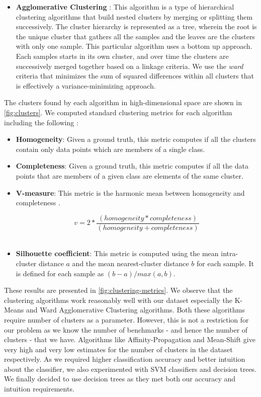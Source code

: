 \begin{itemize}
\item \textbf{Agglomerative Clustering} :
This algorithm is a type of hierarchical clustering algorithms that build nested clusters 
by merging or splitting them successively. 
The cluster hierarchy is represented as a tree, wherein the root is the unique
cluster that gathers all the samples and the leaves are the clusters with only
one sample. 
This particular algorithm uses a bottom up approach. Each samples starts in
its own cluster, and over time the clusters are successively merged together
based on a linkage criteria.
We use the \textit{ward} criteria that minimizes the sum of squared differences 
within all clusters that is effectively a variance-minimizing approach.
\end{itemize}

The clusters found by each algorithm in high-dimensional space are shown in
\cref{fig:clusters}.
We computed standard clustering metrics for each algorithm including the
following :\\

\begin{itemize}
  \item \textbf{Homogeneity}:
	Given a ground truth, this metric computes if all the clusters contain only
	data points which are members of a single class.\\

  \item \textbf{Completeness}: 
	Given a ground truth, this metric computes if all the data points that are
	members of a given class are elements of the same cluster.\\

  \item \textbf{V-measure}: 
	This metric is the harmonic mean between homogeneity and completeness
	\citep{v-measure}.

	$$v = 2 * \frac{(homogeneity * completeness)}{(homogeneity + completeness)}$$\\

  \item \textbf{Silhouette coefficient}: 
  This metric is computed using the mean intra-cluster distance
  $a$ and the mean nearest-cluster distance $b$ for each sample.
  It is defined for each sample as $(b-a)/max(a, b)$.\\
\end{itemize}

These results are presented in \cref{fig:clustering-metrics}. We observe that
the clustering algorithms work reasonably well with our dataset
especially the K-Means and Ward Agglomerative Clustering algorithms. 
Both these algorithms require number of clusters as a parameter. 
However, this is not a restriction for our problem as we know the number of
benchmarks - and hence the number of clusters - that we have.
Algorithms like Affinity-Propagation and Mean-Shift give very high and 
very low estimates for the number of clusters in the dataset respectively.
As we required higher classification accuracy and better intuition about
the classifier, we also experimented with SVM classifiers and decision trees. 
We finally decided to use decision trees as they met both our accuracy
and intuition requirements.


